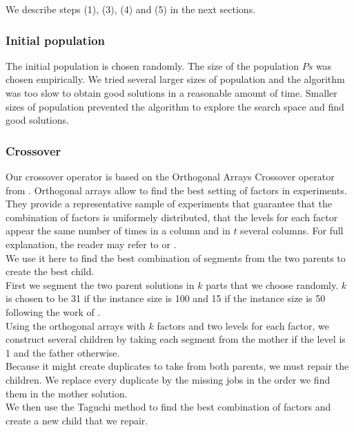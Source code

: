 \documentclass[a4paper,10pt]{article}
\begin{document}
		We describe steps (1), (3), (4) and (5) in the next sections.

		\subsubsection{Initial population}
			The initial population is chosen randomly. The size of the population $Ps$ was chosen empirically. We tried several larger sizes of population and the algorithm was too slow to obtain good solutions in a reasonable amount of time. Smaller sizes of population prevented the algorithm to explore the search space and find good solutions.

		\subsubsection{Crossover}
			Our crossover operator is based on the Orthogonal Arrays Crossover operator from \cite{tseng2010genetic}. Orthogonal arrays allow to find the best setting of factors in experiments. They provide a representative sample of experiments that guarantee that the combination of factors is uniformely distributed, that the levels for each factor appear the same number of times in a column and in $t$ several columns. For full explanation, the reader may refer to \cite{tseng2010genetic} or \cite{montgomery1991design}. \\

			We use it here to find the best combination of segments from the two parents to create the best child. \\

			First we segment the two parent solutions in $k$ parts that we choose randomly. $k$ is chosen to be 31 if the instance size is 100 and 15 if the instance size is 50 following the work of \cite{tseng2010genetic}. \\

			Using the orthogonal arrays with $k$ factors and two levels for each factor, we construct several children by taking each segment from the mother if the level is 1 and the father otherwise. \\

			Because it might create duplicates to take from both parents, we must repair the children. We replace every duplicate by the missing jobs in the order we find them in the mother solution. \\

			We then use the Taguchi method to find the best combination of factors and create a new child that we repair. \\
\end{document}
